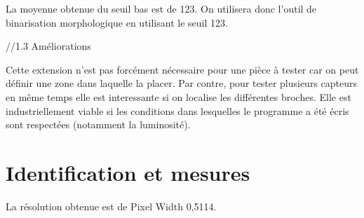 \documentclass{scrreprt}
\begin{document}
La moyenne obtenue du seuil bas est de 123. On utilisera donc l'outil de binarisation morphologique en utilisant
le seuil 123. 


//1.3 Améliorations

Cette extension n'est pas forcément nécessaire pour une pièce à tester car on peut définir une zone dans laquelle la placer. Par contre, pour tester plusieurs capteurs en même temps 
elle est interessante si on localise les différentes broches. Elle est industriellement viable si les conditions dans lesquelles le programme a été écris sont respectées (notamment
la luminosité).

\chapter{Identification et mesures}

La résolution obtenue est de Pixel Width 0,5114.
\end{document}
